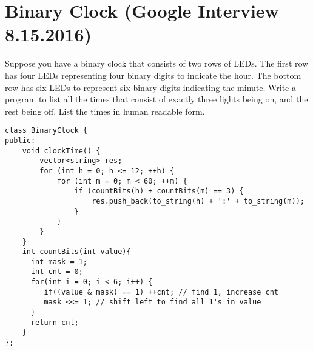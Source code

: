 \section{Binary Clock (Google Interview 8.15.2016)}
Suppose you have a binary clock that consists of two rows of LEDs. The first row has four LEDs representing four binary digits to indicate the hour. The bottom row has six LEDs to represent six binary digits indicating the minute. Write a program to list all the times that consist of exactly three lights being on, and the rest being off. List the times in human readable form.\\

\begin{lstlisting}
class BinaryClock {
public:
    void clockTime() {
        vector<string> res;
        for (int h = 0; h <= 12; ++h) {
            for (int m = 0; m < 60; ++m) {
                if (countBits(h) + countBits(m) == 3) {
                    res.push_back(to_string(h) + ':' + to_string(m));
                }
            }
        }
    }
    int countBits(int value){
      int mask = 1;
      int cnt = 0;
      for(int i = 0; i < 6; i++) {
         if((value & mask) == 1) ++cnt; // find 1, increase cnt
         mask <<= 1; // shift left to find all 1's in value
      }
      return cnt;       
    }
};
\end{lstlisting}